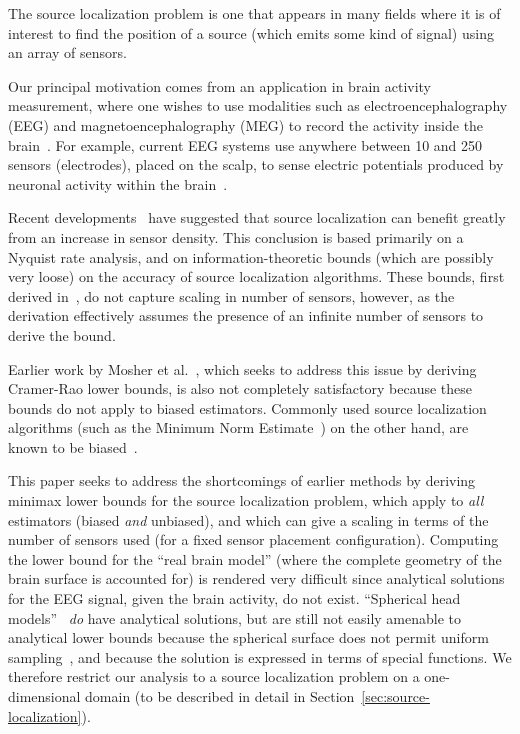 \documentclass[conference]{IEEEtran}
\begin{document}

The source localization problem is one that appears in many fields where it is
of interest to find the position of a source (which emits some kind of signal)
using an array of sensors.

Our principal motivation comes from an application in brain activity
measurement, where one wishes to use modalities such as electroencephalography
(EEG) and magnetoencephalography (MEG) to record the activity inside the
brain~\cite{Baillet2001Electromagnetic}.  For example, current EEG systems use
anywhere between 10 and 250 sensors (electrodes), placed on the scalp, to sense
electric potentials produced by neuronal activity within the
brain~\cite{Nunez2006Electric}.

Recent developments~\cite{Grover2016Information} have suggested that source
localization can benefit greatly from an increase in sensor density. This
conclusion is based primarily on a Nyquist rate analysis, and on
information-theoretic bounds (which are possibly very loose) on the accuracy of
source localization algorithms. These bounds, first derived
in~\cite{Grover2016Fundamental}, do not capture scaling in number of sensors,
however, as the derivation effectively assumes the presence of an infinite
number of sensors to derive the bound.

Earlier work by Mosher et al.~\cite{Mosher1993Error}, which seeks to address
this issue by deriving Cramer-Rao lower bounds, is also not completely
satisfactory because these bounds do not apply to biased estimators. Commonly
used source localization algorithms (such as the Minimum Norm
Estimate~\cite{Hamalainen1994Interpreting}) on the other hand, are known to be
biased~\cite{Lin2006Assessing}.

This paper seeks to address the shortcomings of earlier methods by deriving
minimax lower bounds for the source localization problem, which apply to
\emph{all} estimators (biased \emph{and} unbiased), and which can give a
scaling in terms of the number of sensors used (for a fixed sensor placement
configuration). Computing the lower bound for the ``real brain model'' (where
the complete geometry of the brain surface is accounted for) is rendered very
difficult since analytical solutions for the EEG signal, given the brain
activity, do not exist. ``Spherical head
models''~\cite{Nunez2006Electric,Grover2016Information} \emph{do} have
analytical solutions, but are still not easily amenable to analytical lower
bounds because the spherical surface does not permit uniform
sampling~\cite{ImpossibilityOfSphereSampling}, and because the solution is
expressed in terms of special functions. We therefore restrict our analysis to
a source localization problem on a one-dimensional domain (to be described in
detail in Section~\ref{sec:source-localization}).
\end{document}

